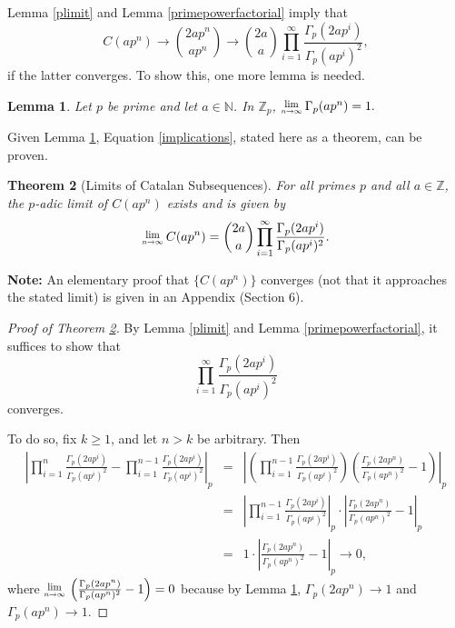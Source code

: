 \documentclass[12pt, letter]{article}    %
\theoremstyle{plain}
\newtheorem{theorem}{Theorem}[section]
\newtheorem{lemma}[theorem]{Lemma}
\theoremstyle{definition}
\numberwithin{equation}{section}
\newcommand{\Lim}[1]{\raisebox{0.5ex}{\scalebox{0.8}{$\displaystyle \lim_{#1}\;$}}}
\newcommand{\thref}[1]{Theorem \ref{#1}}
\newcommand{\lemref}[1]{Lemma \ref{#1}}
\newcommand{\eref}[1]{Equation \ref{#1}}
\newcommand{\thlabel}[1]{\label{#1}}
\begin{document}
\lemref{plimit} and \lemref{primepowerfactorial} imply that 
\begin{equation}
\label{implications}C(ap^n)\rightarrow {2ap^n \choose ap^n} \rightarrow {2a \choose a}\prod\limits_{i=1}^\infty \frac{\Gamma_p(2ap^i)}{\Gamma_p(ap^i)^2},
\end{equation} 
if the latter converges. To show this, one more lemma is needed.

\begin{lemma}\thlabel{p gamma}
Let $p$ be prime and let $a\in\mathbb{N}$. In $\mathbb{Z}_p$,
$\Lim{n\rightarrow \infty}\Gamma_p(ap^n)=1.$
\end{lemma} 

\noindent Given \lemref{p gamma}, \eref{implications}, stated here as a theorem, can be proven.

\begin{theorem}[Limits of Catalan Subsequences]\thlabel{limit thm}
For all primes $p$ and all $a\in\mathbb{Z}$, the $p$-adic limit of $C(ap^n)$ exists and is given by $$\Lim{n\rightarrow \infty} C(ap^n)=
\binom{2a}{a}\prod_{i=1}^{\infty}\frac{\Gamma_p(2ap^i)}{\Gamma_p(ap^i)^2}.$$
\end{theorem}

\noindent \textbf{Note:} An elementary proof that $\{C(ap^n)\}$ converges (not that it approaches the stated limit) is given in an Appendix (Section 6).

\begin{proof}[Proof of \thref{limit thm}]
By \lemref{plimit} and \lemref{primepowerfactorial}, it suffices to show that $$\prod_{i=1}^\infty \frac{\Gamma_p(2ap^i)}{\Gamma_p(ap^i)^2}$$ converges.

To do so, fix $k\geq1$, and let $n>k$ be arbitrary. Then
\begin{eqnarray*}
\left|\prod_{i=1}^n \frac{\Gamma_p(2ap^i)}{\Gamma_p(ap^i)^2}-\prod_{i=1}^{n-1} \frac{\Gamma_p(2ap^i)}{\Gamma_p(ap^i)^2}\right|_p
&=&\left|\left(\prod_{i=1}^{n-1} \frac{\Gamma_p(2ap^i)}{\Gamma_p(ap^i)^2}\right)\left(\frac{\Gamma_p(2ap^n)}{\Gamma_p(ap^n)^2}-1\right)\right|_p\\
&=&\left|\prod_{i=1}^{n-1} \frac{\Gamma_p(2ap^i)}{\Gamma_p(ap^i)^2}\right|_p\cdot\left|\frac{\Gamma_p(2ap^n)}{\Gamma_p(ap^n)^2}-1\right|_p\\
&=&1\cdot\left|\frac{\Gamma_p(2ap^n)}{\Gamma_p(ap^n)^2}-1\right|_p\rightarrow0,
\end{eqnarray*}
where $\Lim{n\rightarrow\infty}\left(\frac{\Gamma_p(2ap^n)}{\Gamma_p(ap^n)^2}-1\right)=0$ because by \lemref{p gamma},  $\Gamma_p(2ap^n)\rightarrow 1$ and $\Gamma_p(ap^n)\rightarrow1$.  \end{proof}
\end{document}
